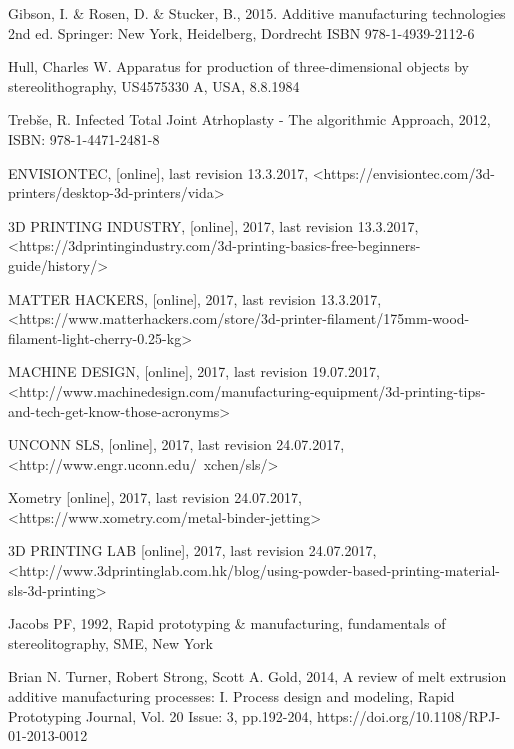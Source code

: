 \documentclass[a4paper, twoside, 11pt]{report}
\begin{document}
\begin{thebibliography}{99}
	Gibson, I. \& Rosen, D. \& Stucker, B.,
	2015.
	Additive manufacturing technologies
	2nd ed.
	Springer:
	New York, Heidelberg, Dordrecht
	ISBN 978-1-4939-2112-6
	
	Hull, Charles W.
	Apparatus for production of three-dimensional objects by stereolithography,
	US4575330 A,
	USA,
	8.8.1984
	
	
	Trebše, R.
	Infected Total Joint Atrhoplasty - The algorithmic Approach,
	2012,
	ISBN: 978-1-4471-2481-8
	
	ENVISIONTEC,
	[online],
	last revision 13.3.2017,
	<https://envisiontec.com/3d-printers/desktop-3d-printers/vida>
	
	3D PRINTING INDUSTRY,
	[online],
	2017,
	last revision 13.3.2017,
	<https://3dprintingindustry.com/3d-printing-basics-free-beginners-guide/history/>
	
	MATTER HACKERS,
	[online],
	2017,
	last revision 13.3.2017,
	<https://www.matterhackers.com/store/3d-printer-filament/175mm-wood-filament-light-cherry-0.25-kg>
	
	MACHINE DESIGN,
	[online],
	2017,
	last revision 19.07.2017,
	<http://www.machinedesign.com/manufacturing-equipment/3d-printing-tips-and-tech-get-know-those-acronyms>
	
	UNCONN SLS,
	[online],
	2017,
	last revision 24.07.2017,
	<http://www.engr.uconn.edu/~xchen/sls/>
	
	Xometry
	[online],
	2017,
	last revision 24.07.2017,
	<https://www.xometry.com/metal-binder-jetting>
	
	3D PRINTING LAB
	[online],
	2017,
	last revision 24.07.2017,
	<http://www.3dprintinglab.com.hk/blog/using-powder-based-printing-material-sls-3d-printing>
	
	Jacobs PF,
	1992,
	Rapid prototyping \& manufacturing,
	fundamentals of stereolitography,
	SME,
	New York
	
	Brian N. Turner, Robert Strong, Scott A. Gold,
	2014,
	A review of melt extrusion additive manufacturing processes: I. Process design and modeling,
	Rapid Prototyping Journal, Vol. 20 Issue: 3, pp.192-204,
	https://doi.org/10.1108/RPJ-01-2013-0012
	

		

\end{thebibliography}
\end{document}
